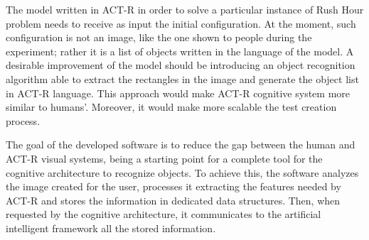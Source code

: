 	The model written in ACT-R in order to solve a particular instance of Rush Hour problem needs to receive as input the initial configuration. At the moment, such configuration is not an image, like the one shown to people during the experiment; rather it is a list of objects written in the language of the model.
	A desirable improvement of the model should be introducing an object recognition algorithm able to extract the rectangles in the image and generate the object list in ACT-R language. 
	This approach would make ACT-R cognitive system more similar to humans'. Moreover, it would make more scalable the test creation process. 

	
	The goal of the developed software is to reduce the gap between the human and ACT-R visual systems, being a starting point for a complete  tool for the cognitive architecture to recognize objects. To achieve this, the software analyzes the image created for the user, processes it extracting the features needed by ACT-R and stores the information in dedicated data structures. Then, when requested by the cognitive architecture, it communicates to the artificial intelligent framework all the stored information. 
	

